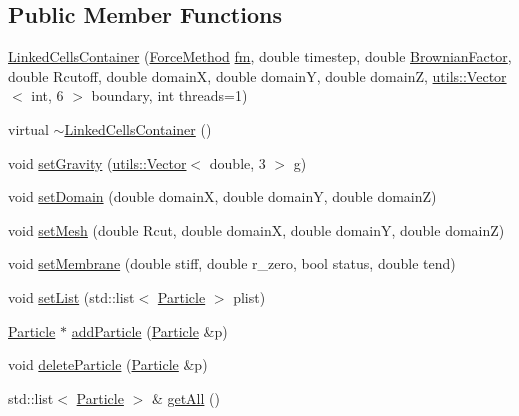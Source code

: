 \subsection*{Public Member Functions}
\begin{DoxyCompactItemize}
\item 
\hyperlink{classLinkedCellsContainer_ac2f170bf35d853298ca749527178de04}{Linked\+Cells\+Container} (\hyperlink{classParticleContainer_a2457078eafdf0fdd9eeb977e63aed6e8}{Force\+Method} \hyperlink{classParticleContainer_a839c3ff474bfece04fcbb0ca3fe9a0f8}{fm}, double timestep, double \hyperlink{classParticleContainer_a64e8a768554b5b6126755e8a8e85f2f5}{Brownian\+Factor}, double Rcutoff, double domainX, double domainY, double domainZ, \hyperlink{classutils_1_1Vector}{utils\+::\+Vector}$<$ int, 6 $>$ boundary, int threads=1)
\item 
virtual \hyperlink{classLinkedCellsContainer_aa59abdf61f50d80dc4b1a71fd727c3a9}{$\sim$\+Linked\+Cells\+Container} ()
\item 
void \hyperlink{classLinkedCellsContainer_a25d0ac927ce692ae3bf944a67f86682a}{set\+Gravity} (\hyperlink{classutils_1_1Vector}{utils\+::\+Vector}$<$ double, 3 $>$ g)
\item 
void \hyperlink{classLinkedCellsContainer_a968810914751bbc961b5c7ec33fab740}{set\+Domain} (double domainX, double domainY, double domainZ)
\item 
void \hyperlink{classLinkedCellsContainer_aad66003287011660d24817371eff4801}{set\+Mesh} (double Rcut, double domainX, double domainY, double domainZ)
\item 
void \hyperlink{classLinkedCellsContainer_a831a33f6b4f90f71396474a99f985575}{set\+Membrane} (double stiff, double r\+\_\+zero, bool status, double tend)
\item 
void \hyperlink{classLinkedCellsContainer_a0c54230125a031821a99fc39b15e6d60}{set\+List} (std\+::list$<$ \hyperlink{classParticle}{Particle} $>$ plist)
\item 
\hyperlink{classParticle}{Particle} $\ast$ \hyperlink{classLinkedCellsContainer_ac1987c930d49b2300a0f3509e282f2f1}{add\+Particle} (\hyperlink{classParticle}{Particle} \&p)
\item 
void \hyperlink{classLinkedCellsContainer_a6466835bf54973f4c7ec916c9b1f089b}{delete\+Particle} (\hyperlink{classParticle}{Particle} \&p)
\item 
std\+::list$<$ \hyperlink{classParticle}{Particle} $>$ \& \hyperlink{classLinkedCellsContainer_a33feabbd2ffc9f8cb34ec237e057b7bc}{get\+All} ()
\item 

\end{DoxyCompactItemize}
